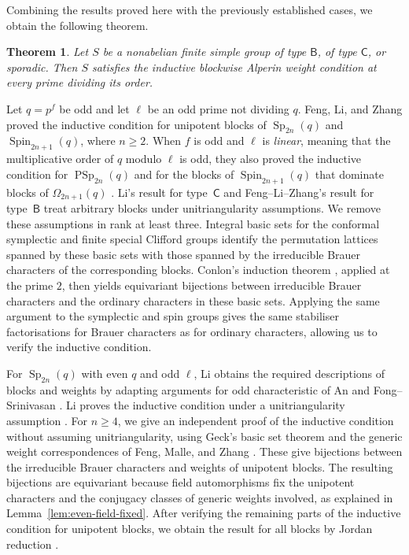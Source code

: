 \documentclass[10pt]{amsart}
\newtheorem{theorem}{Theorem}[section]
\theoremstyle{definition}
\renewcommand{\geq}{\geqslant}
\DeclareMathOperator{\Sp}{Sp}
\DeclareMathOperator{\PSp}{PSp}
\numberwithin{equation}{section}
\numberwithin{table}{section}
\begin{document}
Combining the results proved here with the previously established cases,
we obtain the following theorem.

\begin{theorem}\label{thm:main}
Let $S$ be a nonabelian finite simple group of type $\mathsf B$, of type
$\mathsf C$, or sporadic. Then $S$ satisfies the inductive blockwise
Alperin weight condition at every prime dividing its order.
\end{theorem}

Let $q=p^f$ be odd and let $\ell$ be an odd prime not dividing $q$.
Feng, Li, and Zhang \cite[Theorem~1.5]{FengLiZhang2019} proved the
inductive condition for unipotent blocks of $\Sp_{2n}(q)$ and
$\operatorname{Spin}_{2n+1}(q)$, where $n\geq2$. When $f$ is odd and $\ell$ is
\emph{linear}, meaning that the multiplicative order of $q$ modulo
$\ell$ is odd, they also proved the inductive condition for
$\PSp_{2n}(q)$ and for the blocks of $\operatorname{Spin}_{2n+1}(q)$
that dominate blocks of $\Omega_{2n+1}(q)$
\cite[Theorems~1.2 and~1.4]{FengLiZhang2019}.
Li's result for type~$\mathsf C$
\cite[Theorem~2]{Li2021} and Feng--Li--Zhang's result for type~$\mathsf B$
\cite[Theorem~1]{FengLiZhang2022TypeB} treat arbitrary blocks
under unitriangularity assumptions. We remove these
assumptions in rank at least three. Integral basic sets for the conformal
symplectic and finite special Clifford groups identify the permutation
lattices spanned by these basic sets with those spanned by the irreducible
Brauer characters of the corresponding blocks. Conlon's induction theorem \cite{Conlon1968},
applied at the prime $2$, then yields equivariant bijections between
irreducible Brauer characters and the ordinary characters in these basic
sets. Applying the same argument to the symplectic and spin groups
gives the same stabiliser factorisations for Brauer characters as for
ordinary characters, allowing us to verify the inductive condition.

For $\Sp_{2n}(q)$ with even $q$ and odd $\ell$, Li
\cite[Section~6]{Li2021} obtains the required descriptions of blocks
and weights by adapting arguments for odd characteristic of
An \cite{An1994} and Fong--Srinivasan \cite{FongSrinivasan1989}.
Li proves the inductive condition under a unitriangularity assumption
\cite[Theorem~3]{Li2021}. For $n\geq4$, we give an independent proof
of the inductive condition without assuming unitriangularity, using
Geck's basic set theorem \cite{Geck1993} and the generic weight
correspondences of Feng, Malle, and Zhang \cite{FengMalleZhang2026}.
These give bijections between the irreducible Brauer characters and
weights of unipotent blocks. The resulting bijections are equivariant
because field automorphisms fix the unipotent characters and the conjugacy
classes of generic weights involved, as explained in
Lemma~\ref{lem:even-field-fixed}. After verifying the remaining parts of the
inductive condition for unipotent blocks, we obtain the result for all blocks by
Jordan reduction \cite{FengLiZhang2022Jordan}.
\end{document}
